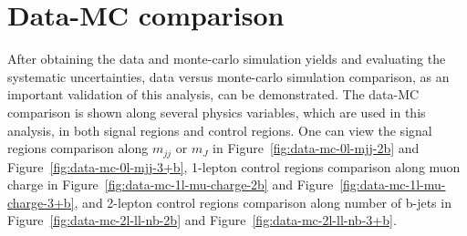 



\section{Data-MC comparison}

\par After obtaining the data and monte-carlo simulation yields and evaluating the systematic uncertainties, data versus monte-carlo simulation comparison, as an important validation of this analysis, can be demonstrated. The data-MC comparison is shown along several physics variables, which are used in this analysis, in both signal regions and control regions. One can view the signal regions comparison along $m_{jj}$ or $m_{J}$ in Figure~\ref{fig:data-mc-0l-mjj-2b} and Figure~\ref{fig:data-mc-0l-mjj-3+b}, 1-lepton control regions comparison along muon charge in Figure~\ref{fig:data-mc-1l-mu-charge-2b} and Figure~\ref{fig:data-mc-1l-mu-charge-3+b}, and 2-lepton control regions comparison along number of b-jets in Figure~\ref{fig:data-mc-2l-ll-nb-2b} and Figure~\ref{fig:data-mc-2l-ll-nb-3+b}.

